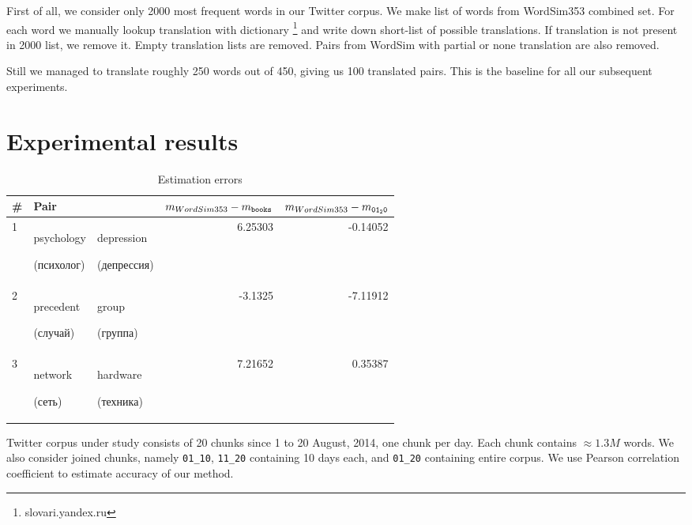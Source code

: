 \documentclass[11pt,letterpaper]{article}
\begin{document}
First of all, we consider only 2000 most frequent words in our Twitter corpus.  
We make list of words from WordSim353 combined set. For each word we manually 
lookup translation with dictionary \footnote{slovari.yandex.ru} and write down short-list 
of possible translations. If translation is not present in 2000 list, we remove it. 
Empty translation lists are removed. Pairs from WordSim with partial or none 
translation are also removed.

Still we managed to translate roughly 250 words out of 450, giving us 100 translated pairs.
This is the baseline for all our subsequent experiments. 

\section{Experimental results}


\begin{table*}[t]
\begin{center}
\begin{tabular}{|l|ll|r|r|}
\hline \bf \# & \bf Pair &  &   $m_{WordSim353} - m_{\tt books} $ & $m_{WordSim353} - m_{\tt 01_20} $  \\ \hline
1 & psychology  \begin{russian}(психолог)\end{russian} & depression \begin{russian}(депрессия)\end{russian} & 6.25303 & -0.14052 \\
2 & precedent \begin{russian}(случай)\end{russian} & group \begin{russian}(группа)\end{russian}  & -3.1325 & -7.11912  \\
3 & network \begin{russian}(сеть)\end{russian} & hardware \begin{russian}(техника)\end{russian} & 7.21652 & 0.35387 \\

\hline
\end{tabular}
\end{center}
\caption{\label{translation-error} Estimation errors }
\end{table*}


Twitter corpus under study consists of 20 chunks since 1 to 20 August, 2014, one chunk per day.
Each chunk contains $\approx 1.3M$ words.
We also consider joined chunks, namely {\tt 01\_10}, {\tt 11\_20} containing 10 days each, and 
{\tt 01\_20} containing entire corpus.
We use Pearson correlation coefficient to estimate accuracy of our method.
\end{document}
